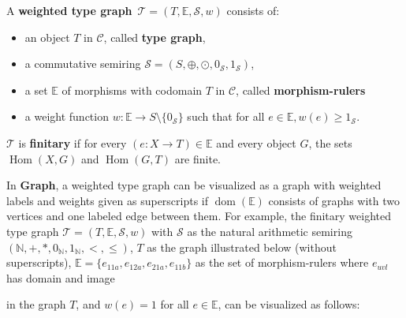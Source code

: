 \begin{definition}
    \label{def:weighted_type_graph}
    A \textbf{weighted type graph}~\(\mathcal{T} = (T, \mathbb{E}, \mathcal{S}, w)\) consists of:
    \begin{itemize} 
        \item an object \(T\) in $\mathcal{C}$, called \textbf{type graph},
        \item a commutative semiring \(\mathcal{S}=(S, \oplus, \odot, 0_\mathcal{S}, 1_\mathcal{S})\),
        \item a set \(\mathbb{E}\) of morphisms with codomain $T$ in $\mathcal{C}$, called \textbf{morphism-rulers}
        \item a weight function \(w : \mathbb{E} \to S \setminus \{0_\mathcal{S}\}\) such that for all $e \in \mathbb{E}, w(e) \geq 1_\mathcal{S}$.
    \end{itemize}
    \(\mathcal{T}\) is \textbf{finitary} if for every \( (e :X \to T) \in \mathbb{E}\) and every object \(G\), the sets \(\operatorname{Hom}(X, G)\) and \(\operatorname{Hom}(G, T)\) are finite.
\end{definition}

\begin{example}
    \label{example:wft:weighted_type_graph}
     In \textbf{Graph}, a weighted type graph can be visualized as a graph with weighted labels and weights given as superscripts if $\operatorname{dom}(\mathbb{E})$ consists of graphs with two vertices and one labeled edge between them. For example, the finitary weighted type graph $\mathcal{T} = (T, \mathbb{E}, \mathcal{S}, w)$ with $\mathcal{S}$ as the natural arithmetic semiring $(\mathbb{N}, +, *, 0_\mathbb{N}, 1_\mathbb{N}, <,\leq)$,
     $T$ as the graph illustrated below (without superscripts), $\mathbb{E}=\{e_{11a},e_{12a},e_{21a},e_{11b}\}$ as the set of morphism-rulers where 
     $e_{uvl}$ has domain 
      and image 
     in the graph $T$,
    and $w(e) = 1$ for all $e \in \mathbb{E}$, can be visualized as follows:
    \begin{center}
    \end{center}
\end{example}